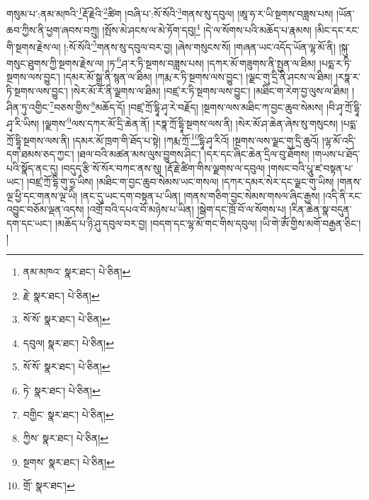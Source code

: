 གསུམ་པ་:ནམ་མཁའི་\footnote{ནམ་མཁའ་  སྣར་ཐང་།  པེ་ཅིན། }རྡོ་རྗེའི་\footnote{རྗེ་  སྣར་ཐང་།  པེ་ཅིན། }ཚིག །བཞི་པ་:སོ་སོའི་\footnote{སོ་སོ་  སྣར་ཐང་།  པེ་ཅིན། }གནས་སུ་དབུལ། །ཨཱ་ཧ་ར་ཡི་སྔགས་བཟླས་པས། །ཡོན་ཆབ་ཀྱིས་ནི་ཕྱག་ཞབས་བཀྲུ། །སྤོས་མེ་ཤངས་ལ་མེ་ཏོག་དབུ།\footnote{དབུལ།  སྣར་ཐང་།  པེ་ཅིན། } །དེ་ལ་སོགས་པའི་མཆོད་པ་རྣམས། །མིང་དང་རང་གི་སྔགས་རྗེས་ལ། །:སོ་སོའི་\footnote{སོ་སོ་  སྣར་ཐང་།  པེ་ཅིན། }གནས་སུ་དབུལ་བར་བྱ། །ཞེས་གསུངས་སོ། །གཞན་ཡང་འདོད་ཡོན་ལྷ་མོ་ནི། །སྐུ་གསུང་ཐུགས་ཀྱི་སྔགས་རྗེས་ལ། །ཏ་\footnote{ཏེ་  སྣར་ཐང་།  པེ་ཅིན། }ཤ་ར་ཏི་སྔགས་བཟླས་པས། །དཀར་མོ་གཟུགས་ནི་སྤྱན་ལ་ཐིམ། །པདྨ་ར་ཏི་སྔགས་ལས་བྱུང་། །དམར་མོ་སྒྲ་ནི་སྙན་ལ་ཐིམ། །ཀརྨ་ར་ཏི་སྔགས་ལས་བྱུང་། །ལྗང་གུ་དྲི་ནི་ཤངས་ལ་ཐིམ། །རཏྣ་ར་ཏི་སྔགས་ལས་བྱུང་། །སེར་མོ་རོ་ནི་ལྗགས་ལ་ཐིམ། །བཛྲ་ར་ཏི་སྔགས་ལས་བྱུང་། །མཐིང་ག་རེག་བྱ་ལུས་ལ་ཐིམ། །ཤིན་ཏུ་འགྱིང་\footnote{བགྱིང་  སྣར་ཐང་།  པེ་ཅིན། }བཅས་གྱིས་\footnote{ཀྱིས་  སྣར་ཐང་།  པེ་ཅིན། }མཆོད་དོ། །བཛྲ་ཀྲོ་དྷཱི་ཤྭ་རེ་བརྗོད། །སྔགས་ལས་མཐིང་ཀ་བྱང་ཆུབ་སེམས། །བི་ཤྭ་ཀྲོ་དྷཱི་ཤྭ་རི་ཡིས། །ལྗགས་\footnote{སྔགས་  སྣར་ཐང་།  པེ་ཅིན། }ལས་དཀར་མོ་དྲི་ཆེན་ནོ། །རཏྣ་ཀྲོ་དྷཱི་སྔགས་ལས་ནི། །སེར་མོ་ཤ་ཆེན་ཞེས་སུ་གསུངས། །པདྨ་ཀྲོ་དྷཱི་སྔགས་ལས་ནི། །དམར་མོ་ཁྲག་གི་ཐོད་པ་སྟེ། །ཀརྨ་ཀྲོ་\footnote{གྲོ་  སྣར་ཐང་། }དྷཱི་ཤྭ་རིའོ། །སྔགས་ལས་ལྗང་གུ་དྲི་ཆུའོ། །ལྷ་མོ་འདི་དག་ཐམས་ཅད་ཀྱང་། །ཐལ་བའི་མཚན་མས་ལུས་བྱུགས་ཤིང་། །དར་དང་ཞིང་ཆེན་དྲིལ་བུ་ཐོགས། །གཡས་པ་ཐོད་པའི་སྣོད་ནང་དུ། །བདུད་རྩི་སོ་སོར་བཀང་ནས་སུ། །རྡོ་རྗེ་ཚིག་གིས་ལྗགས་ལ་དབུལ། །གསང་བའི་པཱུ་ཛ་བསྟན་པ་ཡང་། །བཛྲ་ཀྲོ་དྷི་གུ་ཧྱ་ཡིས། །མཐིང་ག་བྱང་ཆུབ་སེམས་ཡང་གསལ། །དཀར་དམར་སེར་དང་ལྗང་གུ་ཡིས། །གནས་ལྔ་ཕྱི་དང་གནས་ལྔ་ཡི། །ནང་དུ་ཡང་དག་བསྟན་པ་ཡིན། །གནས་གཅིག་བྱང་སེམས་གསལ་ཞིང་རྒྱས། །འདི་ནི་རང་འབྱུང་བཅོམ་ལྡན་འདས། །འགྲོ་བའི་དཔའ་བོ་མཉེས་པ་ཡིན། །སྒེག་དང་ཁྲོ་བོ་ལ་སོགས་པ། །རིན་ཆེན་སྣ་བདུན་དག་དང་ཡང་། །མཆོད་པ་ཉི་ཤུ་དབུལ་བར་བྱ། །བདག་དང་ལྷ་མོ་གང་གིས་དབུལ། །ཡི་གེ་ཨོཾ་གྱིས་མགོ་བརྒྱན་ཅིང་། །
